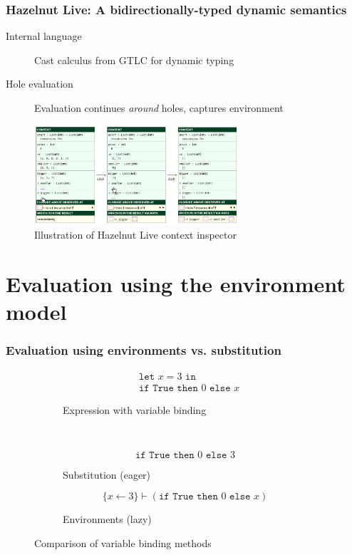 \documentclass{beamer}
\begin{document}
\begin{frame}
  \frametitle{Hazelnut Live: A bidirectionally-typed dynamic semantics}

  \begin{description}
  \item[Internal language] Cast calculus from GTLC for dynamic typing
  \item[Hole evaluation] Evaluation continues \textit{around} holes, captures environment
  \end{description}
  
  \begin{figure}
    \centering
    \includegraphics[height=10em]{thesis/img/hazelnut_live_context_inspector}
    \caption{Illustration of Hazelnut Live context inspector \cite{conf/popl/HazelnutLive19}}
    \label{fig:hazelnut-live-context-inspector}
  \end{figure}
\end{frame}

\section{Evaluation using the environment model}

\begin{frame}
  \frametitle{Evaluation using environments vs. substitution}

  \begin{figure}
    \centering
    \begin{subfigure}[b]{0.45\textwidth}
      \begin{align*}
        & \texttt{let }x=3\texttt{ in}\\
        & \texttt{if True then }0\texttt{ else }x
      \end{align*}
      \caption{Expression with variable binding}
    \end{subfigure} \\
    \begin{subfigure}[b]{0.35\textwidth}
      \begin{equation*}
        \texttt{if True then }0\texttt{ else }3
      \end{equation*}
      \caption{Substitution (eager)}
    \end{subfigure}
    \qquad
    \begin{subfigure}[b]{0.55\textwidth}
      \begin{equation*}
        \{x\leftarrow 3\}\vdash(\texttt{if True then }0\texttt{ else }x)
      \end{equation*}
      \caption{Environments (lazy)}
    \end{subfigure}
    \caption{Comparison of variable binding methods}
  \end{figure}
\end{frame}
\end{document}
